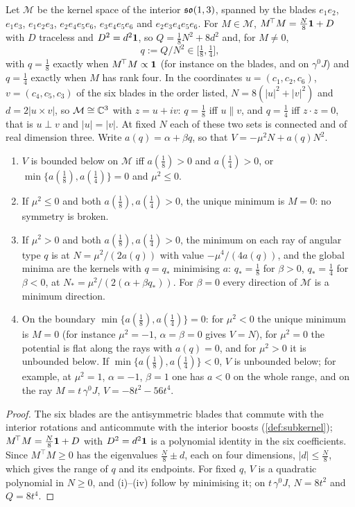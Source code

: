 \begin{lemma}
\label{lem:tracepot}
Let $\mathcal M$ be the kernel space of the interior $\mathfrak{so}(1,3)$, spanned by the blades $e_1e_2$, $e_1e_3$, $e_1e_2e_3$, $e_2e_4e_5e_6$, $e_3e_4e_5e_6$ and
$e_2e_3e_4e_5e_6$. For $M\in\mathcal M$, $M^{\!\top}M=\tfrac N8\mathbf 1+D$ with $D$ traceless and $D^2=d^2\mathbf 1$, so $Q=\tfrac18N^2+8d^2$ and, for $M\neq0$,
\[
q:=Q/N^2\in\bigl[\tfrac18,\tfrac14\bigr],
\]
with $q=\tfrac18$ exactly when $M^{\!\top}M\propto\mathbf 1$ (for instance on the blades, and on $\gamma^0J$) and $q=\tfrac14$ exactly when $M$ has rank four. In the
coordinates $u=(c_1,c_2,c_6)$, $v=(c_4,c_5,c_3)$ of the six blades in the order listed, $N=8(|u|^2+|v|^2)$ and $d=2|u\times v|$, so $\mathcal M\cong\mathbb{C}^3$ with
$z=u+iv$: $q=\tfrac18$ iff $u\parallel v$, and $q=\tfrac14$ iff $z\cdot z=0$, that is $u\perp v$ and $|u|=|v|$. At fixed $N$ each of these two sets is connected and of
real dimension three. Write
$a(q)=\alpha+\beta q$, so that $V=-\mu^2N+a(q)N^2$.
\begin{enumerate}[label=(\roman*),leftmargin=2.2em]
\item $V$ is bounded below on $\mathcal M$ iff $a(\tfrac18)>0$ and $a(\tfrac14)>0$, or $\min\{a(\tfrac18),a(\tfrac14)\}=0$ and $\mu^2\le0$.
\item If $\mu^2\le0$ and both $a(\tfrac18),a(\tfrac14)>0$, the unique minimum is $M=0$: no symmetry is broken.
\item If $\mu^2>0$ and both $a(\tfrac18),a(\tfrac14)>0$, the minimum on each ray of angular type $q$ is at $N=\mu^2/(2a(q))$ with value $-\mu^4/(4a(q))$, and the
global minima are the kernels with $q=q_*$ minimising $a$: $q_*=\tfrac18$ for $\beta>0$, $q_*=\tfrac14$ for $\beta<0$, at $N_*=\mu^2/(2(\alpha+\beta q_*))$. For
$\beta=0$ every direction of $\mathcal M$ is a minimum direction.
\item On the boundary $\min\{a(\tfrac18),a(\tfrac14)\}=0$: for $\mu^2<0$ the unique minimum is $M=0$ (for instance $\mu^2=-1$, $\alpha=\beta=0$ gives
$V=N$), for $\mu^2=0$ the potential is flat along the rays with $a(q)=0$, and for $\mu^2>0$ it is unbounded below. If
$\min\{a(\tfrac18),a(\tfrac14)\}<0$, $V$ is unbounded below; for example, at $\mu^2=1$, $\alpha=-1$, $\beta=1$ one has $a<0$ on the whole range, and on
the ray $M=t\,\gamma^0J$, $V=-8t^2-56t^4$.
\end{enumerate}
\end{lemma}

\begin{proof}
The six blades are the antisymmetric blades that commute with the interior rotations and anticommute with the interior boosts (\cref{def:subkernel});
$M^{\!\top}M=\tfrac N8\mathbf 1+D$ with $D^2=d^2\mathbf 1$ is a polynomial identity in the six coefficients. Since $M^{\!\top}M\ge0$ has the eigenvalues $\tfrac N8\pm d$, each on four
dimensions, $|d|\le\tfrac N8$, which gives the range of $q$ and its endpoints. For fixed $q$, $V$ is a quadratic polynomial in $N\ge0$, and (i)--(iv) follow by
minimising it; on $t\,\gamma^0J$, $N=8t^2$ and $Q=8t^4$.
\end{proof}

